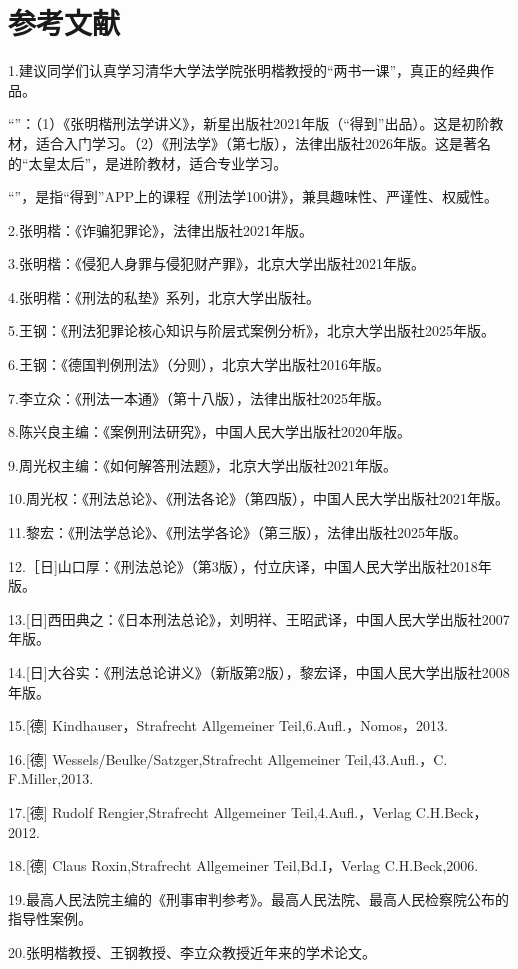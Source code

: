 \chapter*{参考文献}
1.建议同学们认真学习清华大学法学院张明楷教授的“两书一课”，真正的经典作品。

“”：（1）《张明楷刑法学讲义》，新星出版社2021年版（“得到”出品）。这是初阶教材，适合入门学习。（2）《刑法学》（第七版），法律出版社2026年版。这是著名的“太皇太后”，是进阶教材，适合专业学习。

“”，是指“得到”APP上的课程《刑法学100讲》，兼具趣味性、严谨性、权威性。

2.张明楷：《诈骗犯罪论》，法律出版社2021年版。

3.张明楷：《侵犯人身罪与侵犯财产罪》，北京大学出版社2021年版。

4.张明楷：《刑法的私垫》系列，北京大学出版社。

5.王钢：《刑法犯罪论核心知识与阶层式案例分析》，北京大学出版社2025年版。

6.王钢：《德国判例刑法》（分则），北京大学出版社2016年版。

7.李立众：《刑法一本通》（第十八版），法律出版社2025年版。

8.陈兴良主编：《案例刑法研究》，中国人民大学出版社2020年版。

9.周光权主编：《如何解答刑法题》，北京大学出版社2021年版。

10.周光权：《刑法总论》、《刑法各论》（第四版），中国人民大学出版社2021年版。

11.黎宏：《刑法学总论》、《刑法学各论》（第三版），法律出版社2025年版。

12.［日]山口厚：《刑法总论》（第3版），付立庆译，中国人民大学出版社2018年版。

13.[日]西田典之：《日本刑法总论》，刘明祥、王昭武译，中国人民大学出版社2007年版。

14.[日]大谷实：《刑法总论讲义》（新版第2版），黎宏译，中国人民大学出版社2008年版。

15.[德] Kindhauser，Strafrecht Allgemeiner Teil,6.Aufl.，Nomos，2013.

16.[德] Wessels/Beulke/Satzger,Strafrecht Allgemeiner Teil,43.Aufl.，C. F.Miller,2013.

17.[德] Rudolf Rengier,Strafrecht Allgemeiner Teil,4.Aufl.，Verlag C.H.Beck，2012.

18.[德] Claus Roxin,Strafrecht Allgemeiner Teil,Bd.I，Verlag C.H.Beck,2006.

19.最高人民法院主编的《刑事审判参考》。最高人民法院、最高人民检察院公布的指导性案例。

20.张明楷教授、王钢教授、李立众教授近年来的学术论文。
